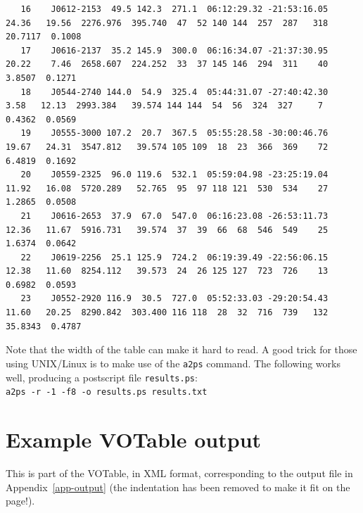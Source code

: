 \documentclass[12pt,a4paper]{article}
\begin{document}
\begin{landscape}
{\begin{verbatim}
   16    J0612-2153  49.5 142.3  271.1  06:12:29.32 -21:53:16.05   24.36   19.56  2276.976  395.740  47  52 140 144  257  287   318   20.7117  0.1008
   17    J0616-2137  35.2 145.9  300.0  06:16:34.07 -21:37:30.95   20.22    7.46  2658.607  224.252  33  37 145 146  294  311    40    3.8507  0.1271
   18    J0544-2740 144.0  54.9  325.4  05:44:31.07 -27:40:42.30    3.58   12.13  2993.384   39.574 144 144  54  56  324  327     7    0.4362  0.0569
   19    J0555-3000 107.2  20.7  367.5  05:55:28.58 -30:00:46.76   19.67   24.31  3547.812   39.574 105 109  18  23  366  369    72    6.4819  0.1692
   20    J0559-2325  96.0 119.6  532.1  05:59:04.98 -23:25:19.04   11.92   16.08  5720.289   52.765  95  97 118 121  530  534    27    1.2865  0.0508
   21    J0616-2653  37.9  67.0  547.0  06:16:23.08 -26:53:11.73   12.36   11.67  5916.731   39.574  37  39  66  68  546  549    25    1.6374  0.0642
   22    J0619-2256  25.1 125.9  724.2  06:19:39.49 -22:56:06.15   12.38   11.60  8254.112   39.573  24  26 125 127  723  726    13    0.6982  0.0593
   23    J0552-2920 116.9  30.5  727.0  05:52:33.03 -29:20:54.43   11.60   20.25  8290.842  303.400 116 118  28  32  716  739   132   35.8343  0.4787
  \end{verbatim}
}
Note that the
width of the table can make it hard to read. A good trick for those
using UNIX/Linux is to make use of the {\tt a2ps} command. The
following works well, producing a postscript file {\tt results.ps}:
\\\verb|a2ps -r -1 -f8 -o results.ps results.txt|


\newpage
\section{Example VOTable output}
\label{app-votable}
This is part of the VOTable, in XML format, corresponding to the
output file in Appendix~\ref{app-output} (the indentation has been removed to make it fit on the page!).


\end{landscape}
\end{document}
